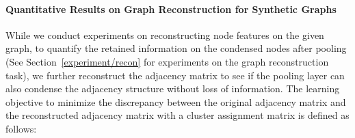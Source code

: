 \documentclass{article} \usepackage{iclr2021_conference,times}
\begin{document}
\begin{table}[t]
\small
\centering
\caption{\small Quantitative results of the graph reconstruction task on reconstructing the node features and the adjacency matrix for synthetic graphs, with two different minimization objectives and error calculation metrics:  and . * indicates the model without using adjacency normalization.}
\label{app:adj:recon}
\end{table}

\paragraph{Quantitative Results on Graph Reconstruction for Synthetic Graphs}
While we conduct experiments on reconstructing node features on the given graph, to quantify the retained information on the condensed nodes after pooling (See Section~\ref{experiment/recon} for experiments on the graph reconstruction task), we further reconstruct the adjacency matrix to see if the pooling layer can also condense the adjacency structure without loss of information. The learning objective to minimize the discrepancy between the original adjacency matrix  and the reconstructed adjacency matrix  with a cluster assignment matrix  is defined as follows: 
\end{document}
